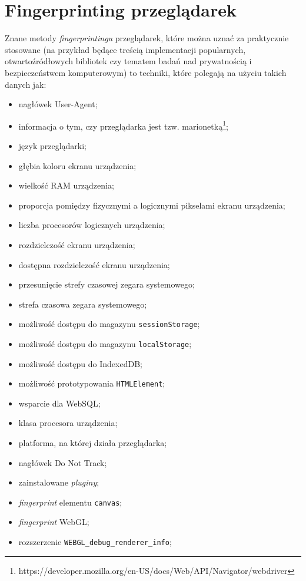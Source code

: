 \section{Fingerprinting przeglądarek}
Znane metody \emph{fingerprintingu} przeglądarek, które można uznać za
praktycznie stosowane (na przykład będące treścią implementacji popularnych,
otwartoźródłowych bibliotek czy tematem badań nad prywatnością i bezpieczeństwem
komputerowym) to techniki, które polegają na użyciu takich danych jak:
\begin{itemize}
	\item nagłówek User-Agent;
	\item informacja o tym, czy przeglądarka jest tzw.
	      marionetką\footnote{https://developer.mozilla.org/en-US/docs/Web/API/Navigator/webdriver};
	\item język przeglądarki;
	\item głębia koloru ekranu urządzenia;
	\item wielkość RAM urządzenia;
	\item proporcja pomiędzy fizycznymi a logicznymi pikselami ekranu
	      urządzenia;
	\item liczba procesorów logicznych urządzenia;
	\item rozdzielczość ekranu urządzenia;
	\item dostępna rozdzielczość ekranu urządzenia;
	\item przesunięcie strefy czasowej zegara systemowego;
	\item strefa czasowa zegara systemowego;
	\item możliwość dostępu do magazynu \texttt{sessionStorage};
	\item możliwość dostępu do magazynu \texttt{localStorage};
	\item możliwość dostępu do IndexedDB;
	\item możliwość prototypowania \texttt{HTMLElement};
	\item wsparcie dla WebSQL;
	\item klasa procesora urządzenia;
	\item platforma, na której działa przeglądarka;
	\item nagłówek Do Not Track;
	\item zainstalowane \emph{pluginy};
	\item \emph{fingerprint} elementu \texttt{canvas};
	\item \emph{fingerprint} WebGL;
	\item rozszerzenie \texttt{WEBGL\_debug\_renderer\_info};

\end{itemize}
